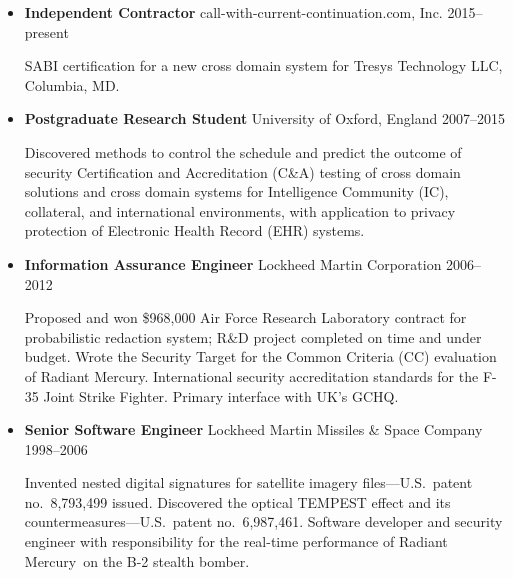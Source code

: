 \begin{itemize}

    \item \textbf{Independent Contractor} \hfill call-with-current-continuation.com, Inc. \hfill 2015--present
        \vspace{-2mm}
        \begin{myquote}
            SABI certification for a new cross domain system for Tresys
            Technology LLC, Columbia, MD.
        \end{myquote}

    \vspace{-2.5mm}
	\item \textbf{Postgraduate Research Student} \hfill University of Oxford, England \hfill 2007--2015
        \vspace{-2mm}
		\begin{myquote}
            Discovered methods to control the schedule and predict the
            outcome of security Certification and Accreditation (C\&A)
            testing of cross domain solutions and cross domain systems for
            Intelligence Community (IC), collateral, and international
            environments, with application to privacy protection
            of Electronic Health Record (EHR) systems.
		\end{myquote}

    \vspace{-2.5mm}
	\item \textbf{Information Assurance Engineer} \hfill Lockheed Martin Corporation \hfill 2006--2012
		\vspace{-2mm}
		\begin{myquote}
            Proposed and won \$968,000 Air Force Research Laboratory
            contract for probabilistic redaction system; R\&D
            project completed on time and under budget. Wrote the
            Security Target for the Common Criteria (CC) evaluation of Radiant
            Mercury\rmtrademark. International security
            accreditation standards for the F-35 Joint Strike Fighter.
            Primary interface with UK's GCHQ.
		\end{myquote}

    \vspace{-2.5mm}
	\item \textbf{Senior Software Engineer} \hfill Lockheed Martin Missiles \& Space Company \hfill 1998--2006
		\vspace{-2mm}
		\begin{myquote}
            Invented nested digital signatures for satellite imagery
            files---U.S.\ patent no.~8,793,499 issued. Discovered the
            optical TEMPEST effect and its countermeasures---U.S.\ patent
            no.~6,987,461. Software developer and security engineer with
            responsibility for the real-time performance of Radiant
            Mercury\rmtrademark\ on the B-2 stealth bomber.
		\end{myquote}


\end{itemize}
